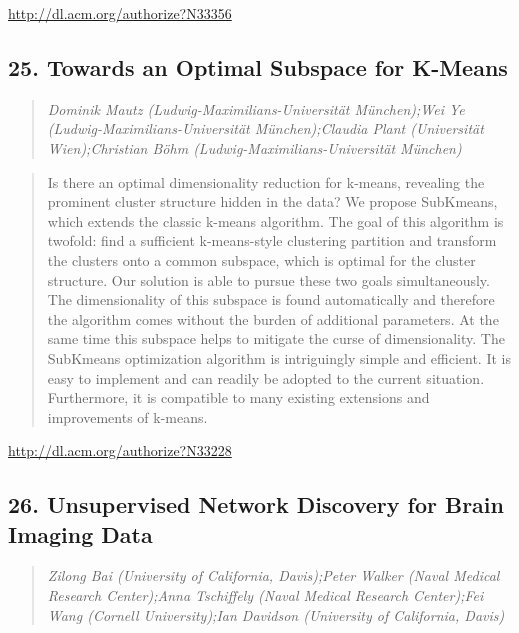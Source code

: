 \documentclass{article}
\begin{document}
\href{http://dl.acm.org/authorize?N33356}{http://dl.acm.org/authorize?N33356}

\subsection{25. Towards an Optimal Subspace for K-Means}

\begin{quote}
\footnotesize{\textit{Dominik Mautz (Ludwig-Maximilians-Universität München);Wei Ye (Ludwig-Maximilians-Universität München);Claudia Plant (Universität Wien);Christian Böhm (Ludwig-Maximilians-Universität München)}}

\end{quote}

\begin{quote}
Is there an optimal dimensionality reduction for k-means, revealing the prominent cluster structure hidden in the data? We propose SubKmeans, which extends the classic k-means algorithm. The goal of this algorithm is twofold: find a sufficient k-means-style clustering partition and transform the clusters onto a common subspace, which is optimal for the cluster structure. Our solution is able to pursue these two goals simultaneously. The dimensionality of this subspace is found automatically and therefore the algorithm comes without the burden of additional parameters. At the same time this subspace helps to mitigate the curse of dimensionality. The SubKmeans optimization algorithm is intriguingly simple and efficient. It is easy to implement and can readily be adopted to the current situation. Furthermore, it is compatible to many existing extensions and improvements of k-means.
\end{quote}

\href{http://dl.acm.org/authorize?N33228}{http://dl.acm.org/authorize?N33228}

\subsection{26. Unsupervised Network Discovery for Brain Imaging Data}

\begin{quote}
\footnotesize{\textit{Zilong Bai (University of California, Davis);Peter Walker (Naval Medical Research Center);Anna Tschiffely (Naval Medical Research Center);Fei Wang (Cornell University);Ian Davidson (University of California, Davis)}}

\end{quote}
\end{document}
